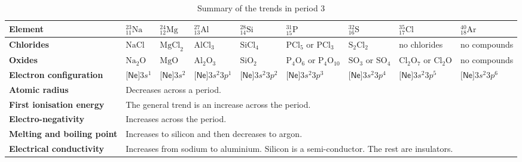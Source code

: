\begin{table}[H]
 \begin{center}
  \begin{tabular}{|p{1.5cm}|p{1cm}|p{1cm}|p{1.4cm}|p{1.4cm}|p{1.4cm}|p{1.4cm}|p{1.4cm}|p{1.4cm}|} \hline
\textbf{Element} & $^{23}_{11}\text{Na}$ & $^{24}_{12}\text{Mg}$ &  $^{27}_{13}\text{Al}$ & $^{28}_{14}\text{Si}$ &  $^{31}_{15}\text{P}$ & $^{32}_{16}\text{S}$ & $^{35}_{17}\text{Cl}$ & $^{40}_{18}\text{Ar}$\\ \hline
   \textbf{Chlorides} & $\text{NaCl}$ & $\text{MgCl}_2$ & $\text{AlCl}_{3}$ & $\text{SiCl}_{4}$ & $\text{PCl}_{5}$ or $\text{PCl}_{3}$ & $\text{S}_{2}\text{Cl}_{2}$ & no chlorides & no compounds \\ \hline
\textbf{Oxides} & $\text{Na}_{2}\text{O}$ & $\text{MgO}$ & $\text{Al}_{2}\text{O}_{3}$ & $\text{SiO}_{2}$ & $\text{P}_{4}\text{O}_{6}$ or $\text{P}_{4}\text{O}_{10}$ & $\text{SO}_{3}$ or $\text{SO}_{4}$ & $\text{Cl}_{2}\text{O}_{7}$ or $\text{Cl}_{2}\text{O}$ & no compounds \\ \hline
\textbf{Electron configuration} & $\textsf{[Ne]}3s^{1}$ & $\textsf{[Ne]}3s^{2}$ & $\textsf{[Ne]}3s^{2}3p^{1}$ & $\textsf{[Ne]}3s^{2}3p^{2}$ & $\textsf{[Ne]}3s^{2}3p^{3}$ & $\textsf{[Ne]}3s^{2}3p^{4}$ & $\textsf{[Ne]}3s^{2}3p^{5}$ & $\textsf{[Ne]}3s^{2}3p^{6}$ \\ \hline
\textbf{Atomic radius} & \multicolumn{8}{p{8cm}|}{Decreases across a period.} \\ \hline
\textbf{First ionisation energy} & \multicolumn{8}{p{8cm}|}{The general trend is an increase across the period.} \\ \hline
\textbf{Electro-negativity} & \multicolumn{8}{p{8cm}|}{Increases across the period.} \\ \hline
\textbf{Melting and boiling point} & \multicolumn{8}{p{8cm}|}{Increases to silicon and then decreases to argon.} \\ \hline
\textbf{Electrical conductivity} & \multicolumn{8}{p{10cm}|}{Increases from sodium to aluminium. Silicon is a semi-conductor. The rest are insulators.} \\ \hline
  \end{tabular}
\caption{Summary of the trends in period 3}
\label{tab:period3trends}
 \end{center}

\end{table}
